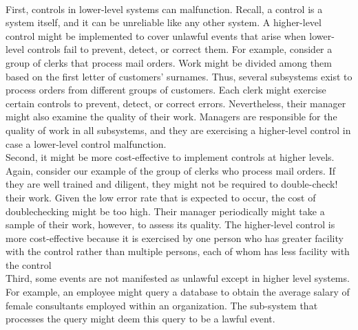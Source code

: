 \documentclass[12pt]{article}
\begin{document}
\\
First, controls in lower-level systems can malfunction. Recall, a control is a system itself, and it can be unreliable like any other system. A higher-level control might be implemented to cover unlawful events that arise when lower-level controls fail to prevent, detect, or correct them. For example, consider a group of clerks that process mail orders. Work might be divided among them based on the first letter of customers' surnames. Thus, several subsystems exist to process orders from different groups of customers. Each clerk might exercise certain controls to prevent, detect, or correct errors. Nevertheless, their manager might also examine the quality of their work. Managers are responsible for the quality of work in all subsystems, and they are exercising a higher-level control in case a lower-level control malfunction.
\\
Second, it might be more cost-effective to implement controls at higher levels. Again, consider our example of the group of clerks who process mail orders. If they are well trained and diligent, they might not be required to double-check! their work. Given the low error rate that is expected to occur, the cost of doublechecking might be too high. Their manager periodically might take a sample of their work, however, to assess its quality. The higher-level control is more cost-effective because it is exercised by one person who has greater facility with the control rather than multiple persons, each of whom has less facility with the control
\\
Third, some events are not manifested as unlawful except in higher level systems. For example, an employee might query a database to obtain the average salary of female consultants employed within an organization. The sub-system that processes the query might deem this query to be a lawful event.
\end{document}
